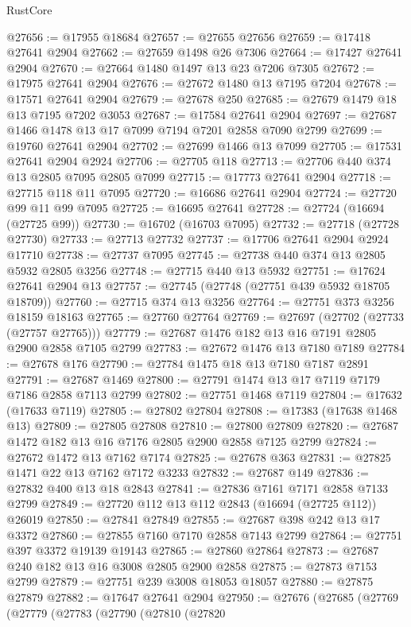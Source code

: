 \begin{lexlean}{RustCore}
\begin{coremodule}
@27656 := @17955 @18684
@27657 := @27655 @27656
@27659 := @17418 @27641 @2904
@27662 := @27659 @1498 @26 @7306
@27664 := @17427 @27641 @2904
@27670 := @27664 @1480 @1497 @13 @23 @7206 @7305
@27672 := @17975 @27641 @2904
@27676 := @27672 @1480 @13 @7195 @7204
@27678 := @17571 @27641 @2904
@27679 := @27678 @250
@27685 := @27679 @1479 @18 @13 @7195 @7202 @3053
@27687 := @17584 @27641 @2904
@27697 := @27687 @1466 @1478 @13 @17 @7099 @7194 @7201 @2858 @7090 @2799
@27699 := @19760 @27641 @2904
@27702 := @27699 @1466 @13 @7099
@27705 := @17531 @27641 @2904 @2924
@27706 := @27705 @118
@27713 := @27706 @440 @374 @13 @2805 @7095 @2805 @7099
@27715 := @17773 @27641 @2904
@27718 := @27715 @118 @11 @7095
@27720 := @16686 @27641 @2904
@27724 := @27720 @99 @11 @99 @7095
@27725 := @16695 @27641
@27728 := @27724 (@16694 (@27725 @99))
@27730 := @16702 (@16703 @7095)
@27732 := @27718 (@27728 @27730)
@27733 := @27713 @27732
@27737 := @17706 @27641 @2904 @2924 @17710
@27738 := @27737 @7095
@27745 := @27738 @440 @374 @13 @2805 @5932 @2805 @3256
@27748 := @27715 @440 @13 @5932
@27751 := @17624 @27641 @2904 @13
@27757 := @27745 (@27748 (@27751 @439 @5932 @18705 @18709))
@27760 := @27715 @374 @13 @3256
@27764 := @27751 @373 @3256 @18159 @18163
@27765 := @27760 @27764
@27769 := @27697 (@27702 (@27733 (@27757 @27765)))
@27779 := @27687 @1476 @182 @13 @16 @7191 @2805 @2900 @2858 @7105 @2799
@27783 := @27672 @1476 @13 @7180 @7189
@27784 := @27678 @176
@27790 := @27784 @1475 @18 @13 @7180 @7187 @2891
@27791 := @27687 @1469
@27800 := @27791 @1474 @13 @17 @7119 @7179 @7186 @2858 @7113 @2799
@27802 := @27751 @1468 @7119
@27804 := @17632 (@17633 @7119)
@27805 := @27802 @27804
@27808 := @17383 (@17638 @1468 @13)
@27809 := @27805 @27808
@27810 := @27800 @27809
@27820 := @27687 @1472 @182 @13 @16 @7176 @2805 @2900 @2858 @7125 @2799
@27824 := @27672 @1472 @13 @7162 @7174
@27825 := @27678 @363
@27831 := @27825 @1471 @22 @13 @7162 @7172 @3233
@27832 := @27687 @149
@27836 := @27832 @400 @13 @18 @2843
@27841 := @27836 @7161 @7171 @2858 @7133 @2799
@27849 := @27720 @112 @13 @112 @2843 (@16694 (@27725 @112)) @26019
@27850 := @27841 @27849
@27855 := @27687 @398 @242 @13 @17 @3372
@27860 := @27855 @7160 @7170 @2858 @7143 @2799
@27864 := @27751 @397 @3372 @19139 @19143
@27865 := @27860 @27864
@27873 := @27687 @240 @182 @13 @16 @3008 @2805 @2900 @2858
@27875 := @27873 @7153 @2799
@27879 := @27751 @239 @3008 @18053 @18057
@27880 := @27875 @27879
@27882 := @17647 @27641 @2904
@27950 := @27676
    (@27685
      (@27769
        (@27779
          (@27783
            (@27790
              (@27810
                (@27820

\end{coremodule}
\end{lexlean}
